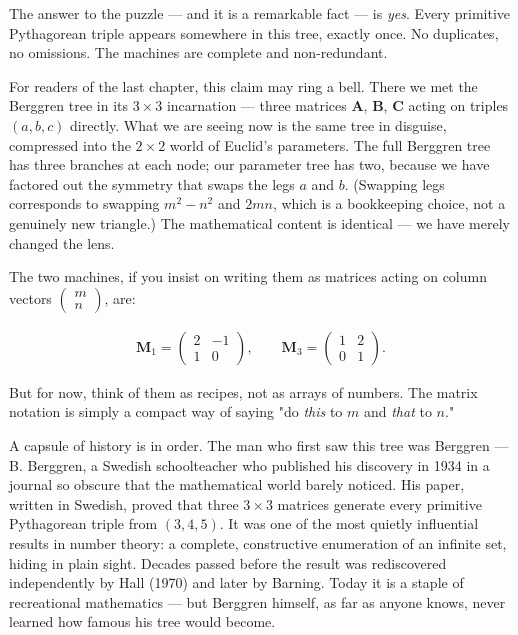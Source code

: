 \documentclass[11pt,twoside,openright]{book}
\theoremstyle{definition}
\theoremstyle{remark}
\begin{document}
The answer to the puzzle --- and it is a remarkable fact --- is \textit{yes}. Every primitive Pythagorean triple appears somewhere in this tree, exactly once. No duplicates, no omissions. The machines are complete and non-redundant.

For readers of the last chapter, this claim may ring a bell. There we met the Berggren tree in its $3 \times 3$ incarnation --- three matrices $\mathbf{A}$, $\mathbf{B}$, $\mathbf{C}$ acting on triples $(a, b, c)$ directly. What we are seeing now is the same tree in disguise, compressed into the $2 \times 2$ world of Euclid's parameters. The full Berggren tree has three branches at each node; our parameter tree has two, because we have factored out the symmetry that swaps the legs $a$ and $b$. (Swapping legs corresponds to swapping $m^2 - n^2$ and $2mn$, which is a bookkeeping choice, not a genuinely new triangle.) The mathematical content is identical --- we have merely changed the lens.

The two machines, if you insist on writing them as matrices acting on column vectors $\begin{pmatrix} m \\ n \end{pmatrix}$, are:

\begin{align*}
\mathbf{M}_1 = \begin{pmatrix} 2 & -1 \\ 1 & 0 \end{pmatrix}, \qquad
\mathbf{M}_3 = \begin{pmatrix} 1 & 2 \\ 0 & 1 \end{pmatrix}.
\end{align*}

But for now, think of them as recipes, not as arrays of numbers. The matrix notation is simply a compact way of saying "do \textit{this} to $m$ and \textit{that} to $n$."

A capsule of history is in order. The man who first saw this tree was Berggren --- B. Berggren, a Swedish schoolteacher who published his discovery in 1934 in a journal so obscure that the mathematical world barely noticed. His paper, written in Swedish, proved that three $3 \times 3$ matrices generate every primitive Pythagorean triple from $(3, 4, 5)$. It was one of the most quietly influential results in number theory: a complete, constructive enumeration of an infinite set, hiding in plain sight. Decades passed before the result was rediscovered independently by Hall (1970) and later by Barning. Today it is a staple of recreational mathematics --- but Berggren himself, as far as anyone knows, never learned how famous his tree would become.
\end{document}

